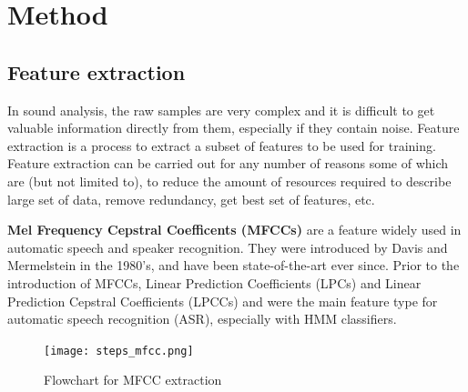 \documentclass{article} %
\begin{document}
\section{Method}

	\subsection{Feature extraction}
		In sound analysis, the raw samples are very complex and it is difficult to get valuable information directly from them, especially if they contain noise.
		Feature extraction is a process to extract a subset of features to be used for training. Feature extraction can be carried out for any number of reasons some of which are (but not limited to), to reduce the amount of resources required to describe large set of data, remove redundancy, get best set of features, etc.

		\textbf{Mel Frequency Cepstral Coefficents (MFCCs)} are a feature widely used in automatic speech and speaker recognition. They were introduced by Davis and Mermelstein in the 1980's, and have been state-of-the-art ever since. Prior to the introduction of MFCCs, Linear Prediction Coefficients (LPCs) and Linear Prediction Cepstral Coefficients (LPCCs) and were the main feature type for automatic speech recognition (ASR), especially with HMM classifiers.\\

		\begin{figure}[H]
		\centering
		  \texttt{[image: steps\_mfcc.png]}
		  \caption{Flowchart for MFCC extraction}
		  \label{fig:mfccflowchart}
		\end{figure}
\end{document}
